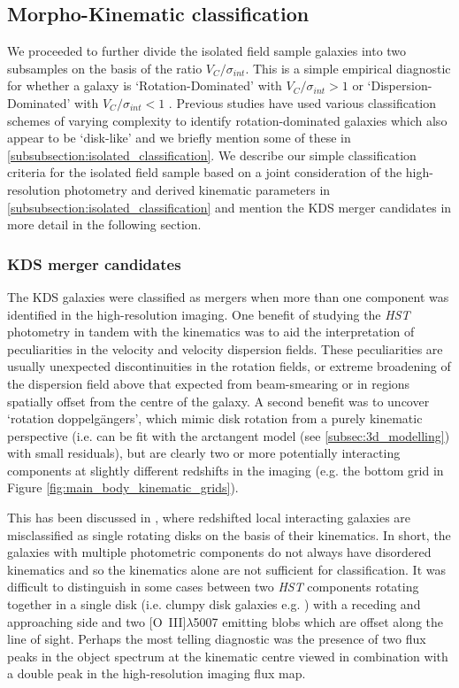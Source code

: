\documentclass[fleqn,usenatbib]{mnras}
\begin{document}
\subsection{Morpho-Kinematic classification}\label{subsec:morpho-kin-class}
We proceeded to further divide the isolated field sample galaxies into two subsamples on the basis of the ratio $V_{C}/\sigma_{int}$.
This is a simple empirical diagnostic for whether a galaxy is `Rotation-Dominated' with $V_{C}/\sigma_{int} > 1$ or `Dispersion-Dominated' with $V_{C}/\sigma_{int} < 1$  \citep[i.e. a method to measure the prevalence of rotational and random motions;][]{Epinat2012,Wisnioski2015,Stott2016,Harrison2017}.
Previous studies have used various classification schemes of varying complexity to identify rotation-dominated galaxies which also appear to be `disk-like' and we briefly mention some of these in \cref{subsubsection:isolated_classification}.
We describe our simple classification criteria for the isolated field sample based on a joint consideration of the high-resolution photometry and derived kinematic parameters in \cref{subsubsection:isolated_classification} and mention the KDS merger candidates in more detail in the following section.

\subsubsection{KDS merger candidates}\label{subsubsection:merger_candidates}
The KDS galaxies were classified as mergers when more than one component was identified in the high-resolution imaging.  
One benefit of studying the {\em HST} photometry in tandem with the kinematics was to aid the interpretation of peculiarities in the velocity and velocity dispersion fields.
These peculiarities are usually unexpected discontinuities in the rotation fields, or extreme broadening of the dispersion field above that expected from beam-smearing or in regions spatially offset from the centre of the galaxy.
A second benefit was to uncover `rotation doppelg{\"a}ngers', which mimic disk rotation from a purely kinematic perspective (i.e. can be fit with the arctangent model (see \cref{subsec:3d_modelling}) with small residuals), but are clearly two or more potentially interacting components at slightly different redshifts in the imaging (e.g. the bottom grid in Figure \ref{fig:main_body_kinematic_grids}).

This has been discussed in \cite{Hung2015}, where redshifted local interacting galaxies are misclassified as single rotating disks on the basis of their kinematics. 
In short, the galaxies with multiple photometric components do not always have disordered kinematics and so the kinematics alone are not sufficient for classification.
It was difficult to distinguish in some cases between two {\em HST} components rotating together in a single disk (i.e. clumpy disk galaxies e.g. \citealt{Elmegreen2004,Bournaud2007}) with a receding and approaching side and two [O~{\sc III}]$\lambda$5007 emitting blobs which are offset along the line of sight.
Perhaps the most telling diagnostic was the presence of two flux peaks in the object spectrum at the kinematic centre viewed in combination with a double peak in the high-resolution imaging flux map.
\end{document}
